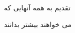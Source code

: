 


\vspace{4cm}

{\Huge
 تقدیم به همه آنهایی که 
\vspace{1.5cm}

\hspace{3cm}
می خواهند بیشتر بدانند
}
